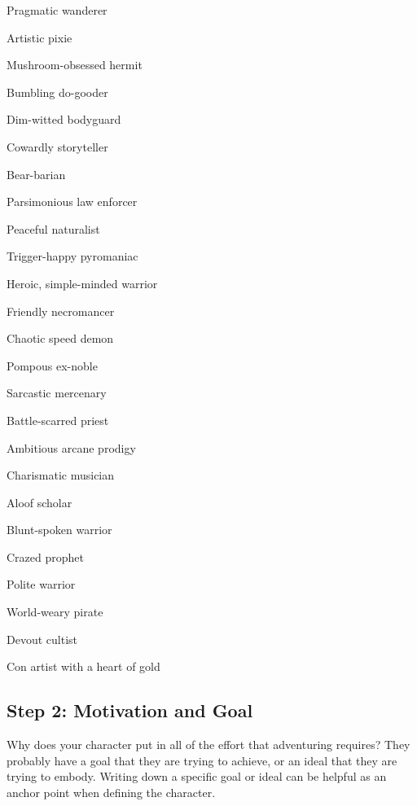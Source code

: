         \begin{raggeditemize}
            \item Pragmatic wanderer
            \item Artistic pixie
            \item Mushroom-obsessed hermit
            \item Bumbling do-gooder
            \item Dim-witted bodyguard
            \item Cowardly storyteller
            \item Bear-barian
            \item Parsimonious law enforcer
            \item Peaceful naturalist
            \item Trigger-happy pyromaniac
            \item Heroic, simple-minded warrior
            \item Friendly necromancer
            \item Chaotic speed demon
            \item Pompous ex-noble
            \item Sarcastic mercenary
            \item Battle-scarred priest
            \item Ambitious arcane prodigy
            \item Charismatic musician
            \item Aloof scholar
            \item Blunt-spoken warrior
            \item Crazed prophet
            \item Polite warrior
            \item World-weary pirate
            \item Devout cultist
            \item Con artist with a heart of gold
        \end{raggeditemize}

    \subsection{Step 2: Motivation and Goal}
        Why does your character put in all of the effort that adventuring requires?
        They probably have a goal that they are trying to achieve, or an ideal that they are trying to embody.
        Writing down a specific goal or ideal can be helpful as an anchor point when defining the character.

